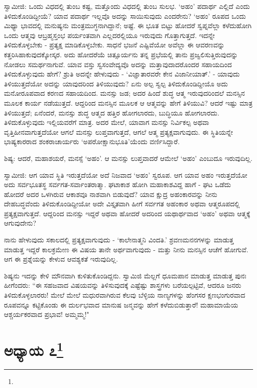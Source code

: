 ಸ್ವಾಮೀಜಿ: ಒಂದು ವಿಧದಲ್ಲಿ ತುಂಬ ಕಷ್ಟ, ಮತ್ತೊಂದು ವಿಧದಲ್ಲಿ ತುಂಬ ಸುಲಭ. ‘ಅಹಂ’ ಪದಾರ್ಥ ಎಲ್ಲಿದೆ ಎಂದು ತಿಳಿದುಕೊಂಡಿದ್ದೀಯೆ? ಯಾವ ಪದಾರ್ಥ ಇಲ್ಲವೊ ಅದನ್ನು ಸಾಯಿಸುವುದು ಎಂದರೇನು? ‘ಅಹಂ’ ರೂಪದ ಒಂದು ಮಿಥ್ಯಾ ಭಾವದಲ್ಲಿ ಮನುಷ್ಯನು ಮಂತ್ರಮುಗ್ಧನಾಗಿದ್ದಾನೆ; ಅಷ್ಟೆ. ಈ ಭೂತ ಬಿಟ್ಟು ಹೋದರೆ ಸ್ವಪ್ನವೆಲ್ಲಾ ಕಳೆದುಹೋಗಿ ಒಂದು ಆತ್ಮವು ಆಬ್ರಹ್ಮಸ್ತಂಭ ಪರ್ಯಂತವಾಗಿ ಎಲ್ಲದರಲ್ಲಿಯೂ ಇರುವುದು ಗೊತ್ತಾಗುತ್ತದೆ. ಇದನ್ನೇ ತಿಳಿದುಕೊಳ್ಳಬೇಕು - ಪ್ರತ್ಯಕ್ಷ ಮಾಡಿಕೊಳ್ಳಬೇಕು. ಸಾಧನೆ ಭಜನೆ ಎಷ್ಟಿವೆಯೋ ಅವೆಲ್ಲಾ ಈ ಆವರಣವನ್ನು ಕತ್ತರಿಸಿಹಾಕುವುದಕ್ಕೋಸ್ಕರ. ಅದು ಹೋದರೆಯೆ ಚಿತ್ಸೂರ್ಯನು ತನ್ನ ಪ್ರಭೆಯಲ್ಲಿ ತಾನು ಪ್ರಜ್ವಲಿಸುತ್ತಿರುವುದನ್ನು ನೋಡಲು ಸಮರ್ಥನಾಗುವೆ. ಯಾವ ವಸ್ತು ಸ್ವಸಂವೇದ್ಯವೊ ಅದನ್ನು ಮತ್ತಾವುದಾದರೊಂದರ ಸಹಾಯದಿಂದ ತಿಳಿದುಕೊಳ್ಳುವುದು ಹೇಗೆ? ಶ್ರುತಿ ಅದನ್ನೇ ಹೇಳುವುದು - ‘ವಿಜ್ಞಾತಾರವರೇ ಕೇನ ವಿಜಾನೀಯಾತ್.’ - ಯಾವುದು ತಿಳಿಯುತ್ತದೆಯೋ ಅದನ್ನು ಯಾವುದರಿಂದ ತಿಳಿಯುವುದು? ಏನು ಅಲ್ಪ ಸ್ವಲ್ಪ ತಿಳಿದುಕೊಂಡಿದ್ದೀಯೊ ಅದು ಮನೋರೂಪವಾದ ಕರಣದ ಸಹಾಯದಿಂದ. ಮನಸ್ಸು ಜಡ; ಅದರ ಹಿಂದೆ ಶುದ್ಧ ಆತ್ಮ ಇರುವುದರಿಂದಲೆ ಮನಸ್ಸಿನ ಮೂಲಕ ಕಾರ್ಯ ನಡೆಯುತ್ತದೆ. ಆದ್ದರಿಂದ ಮನಸ್ಸಿನ ಮೂಲಕ ಆ ಆತ್ಮವನ್ನು ಹೇಗೆ ತಿಳಿಯುವಿ? ಆದರೆ ಇಷ್ಟು ಮಾತ್ರ ತಿಳಿಯುತ್ತದೆ; ಏನೆಂದರೆ, ಮನಸ್ಸು ಶುದ್ಧ ಆತ್ಮದ ಹತ್ತಿರ ಹೋಗಲಾರದು, ಬುದ್ಧಿಯೂ ಹೋಗಲಾರದು. ತಿಳಿದುಕೊಳ್ಳುವುದು ಇಲ್ಲಿಯವರೆಗೆ ಮಾತ್ರ. ಅದರ ಮೇಲೆ, ಯಾವಾಗ ಮನಸ್ಸು ನಿರ್ವಿಕಲ್ಪ ಅಥವಾ ವೃತ್ತಿಹೀನವಾಗುತ್ತದೆಯೋ ಆಗಲೆ ಮನಸ್ಸು ಲುಪ್ತವಾಗುತ್ತದೆ, ಆಗಲೆ ಆತ್ಮ ಪ್ರತ್ಯಕ್ಷವಾಗುವುದು. ಈ ಸ್ಥಿತಿಯನ್ನೇ ಭಾಷ್ಯಕಾರರಾದ ಶಂಕರಾಚಾರ್ಯರು ‘ಅಪರೋಕ್ಷಾನುಭೂತಿ’ಯೆಂದು ವರ್ಣಿಸಿದ್ದಾರೆ.

ಶಿಷ್ಯ: ಆದರೆ, ಮಹಾಶಯರೆ, ಮನಸ್ಸೆ ‘ಅಹಂ’. ಆ ಮನಸ್ಸು ಲುಪ್ತವಾದರೆ ಆಮೇಲೆ ‘ಅಹಂ’ ಎಂಬುದೂ ಇರುವುದಿಲ್ಲ.

ಸ್ವಾಮೀಜಿ: ಆಗ ಯಾವ ಸ್ಥಿತಿ ಇರುತ್ತದೆಯೋ ಅದೆ ನಿಜವಾದ ‘ಅಹಂ’ ಸ್ವರೂಪ. ಆಗ ಯಾವ ಅಹಂ ಇರುತ್ತದೆಯೋ ಅದು ಸರ್ವಭೂತಸ್ಥ ಸರ್ವಗತ-ಸರ್ವಾಂತರಾತ್ಮಾ. ಘಟಾಕಾಶ ಹೋಗಿ ಮಹಾಕಾಶವಿದ್ದ ಹಾಗೆ - ಘಟ ಒಡೆದು ಹೋದರೆ ಅದರ ಒಳಗಿರುವ ಆಕಾಶವೂ ನಾಶವಾಗಿ ಬಿಡುವುದೆ? ಯಾವ ಕ್ಷುದ್ರ ಅಹಂಕಾರವನ್ನು ನೀನು ದೇಹಬದ್ಧವೆಂದು ತಿಳಿದುಕೊಂಡಿದ್ದೀಯೋ ಅದೇ ವಿಸ್ತೃತವಾಗಿ ಹೀಗೆ ಸರ್ವಗತ ಅಹಂಕಾರ ಅಥವಾ ಆತ್ಮರೂಪದಲ್ಲಿ ಪ್ರತ್ಯಕ್ಷವಾಗುತ್ತದೆ. ಆದ್ದರಿಂದ ಮನಸ್ಸು ಇದ್ದರೆ ಅಥವಾ ಹೋದರೆ ಅದರಿಂದ ಯಥಾರ್ಥವಾದ ‘ಅಹಂ’ ಅಥವಾ ಆತ್ಮಕ್ಕೆ ಆಗುವುದೇನು?

ನಾನು ಹೇಳುವುದು ಸಕಾಲದಲ್ಲಿ ಪ್ರತ್ಯಕ್ಷವಾಗುವುದು - ‘ಕಾಲೇನಾತ್ಮನಿ ವಿಂದತಿ.’ ಶ್ರವಣಮನನಗಳನ್ನು ಮಾಡುತ್ತ ಮಾಡುತ್ತ ಇದ್ದರೆ ಕಾಲಕ್ರಮೇಣ ಈ ವಿಷಯ ತಾನೇ ಅರ್ಥವಾಗುವುದು - ಮತ್ತು ನೀನು ಮನಸ್ಸಿನ ಆಚೆಗೆ ಹೋಗುವೆ. ಆಗ ಈ ಪ್ರಶ್ನೆಯನ್ನು ಕೇಳುವ ಆವಶ್ಯಕತೆ ಇರುವುದಿಲ್ಲ.

ಶಿಷ್ಯನು ಇದನ್ನು ಕೇಳಿ ಮೌನವಾಗಿ ಕುಳಿತುಕೊಂಡಿದ್ದನು. ಸ್ವಾಮಿಜಿ ಮೆಲ್ಲಗೆ ಧೂಮಪಾನ ಮಾಡುತ್ತ ಮಾಡುತ್ತ ಪುನಃ ಹೀಗೆಂದರು: “ಈ ಸಹಜವಾದ ವಿಷಯವನ್ನು ತಿಳಿಸುವುದಕ್ಕೆ ಎಷ್ಟೆಷ್ಟು ಶಾಸ್ತ್ರಗಳು ಬರೆಯಲ್ಪಟ್ಟಿವೆ, ಆದರೂ ಜನರು ತಿಳಿದುಕೊಳ್ಳಲಾರರು! ಮೇಲೆ ಮೇಲೆ ಮಧುರವಾಗಿರುವ ಕೆಲವು ಬೆಳ್ಳಿಯ ನಾಣ್ಯಗಳನ್ನು ಹೆಂಗಸರ ಕ್ಷಣಭಂಗುರವಾದ ರೂಪವನ್ನೂ ಕಟ್ಟಿಕೊಂಡು ಈ ದುರ್ಲಭವಾದ ಮಾನುಷ ಜನ್ಮವನ್ನು ಹೇಗೆ ಕಳೆದುಬಿಡುತ್ತಾರೆ! ಮಹಾಮಾಯೆಯ ಆಶ್ಚರ್ಯಕರವಾದ ಪ್ರಭಾವ! ಅಮ್ಮಮ್ಮ!"

\newpage

\chapter[ಅಧ್ಯಾಯ ೭]{ಅಧ್ಯಾಯ ೭\protect\footnote{}}

